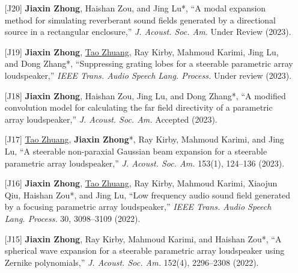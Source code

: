 \documentclass[10pt,a4paper,ragged2e,withhyper]{altacv}
\newcommand{\PubJournal}[1]{\textit{#1}}
\newcommand{\PubTitle}[1]{``{#1,}''}
\newcommand{\PubCorAuthor}[1]{#1*}
\newcommand{\PubMe}[1]{\textbf{#1}}
\begin{document}
\begin{itemize}[leftmargin = 30pt]
    \justifying 
    \item[{[J20]}]
        \PubMe{Jiaxin Zhong}, Haishan Zou, and \PubCorAuthor{Jing Lu},
        \PubTitle{A modal expansion method for simulating reverberant sound fields generated by a directional source in a rectangular enclosure}
        \PubJournal{J. Acoust. Soc. Am.} 
        Under Review (2023).
    \item[{[J19]}]
        \PubMe{Jiaxin Zhong}, \underline{Tao Zhuang}, Ray Kirby, Mahmoud Karimi, Jing Lu, and \PubCorAuthor{Dong Zhang},
        \PubTitle{Suppressing grating lobes for a steerable parametric array loudspeaker}
        \PubJournal{IEEE Trans. Audio Speech Lang. Process.}
        Under review (2023).
        
    \item[{[J18]}]
        \PubMe{Jiaxin Zhong}, Haishan Zou, Jing Lu, and \PubCorAuthor{Dong Zhang},
        \PubTitle{A modified convolution model for calculating the far field directivity of a parametric array loudspeaker}
        \PubJournal{J. Acoust. Soc. Am.}
        Accepted (2023).


    \item[{[J17]}]
        \underline{Tao Zhuang}, 
        \PubCorAuthor{\PubMe{Jiaxin Zhong}},
        Ray Kirby, Mahmoud Karimi, and Jing Lu, 
        \PubTitle{A steerable non-paraxial Gaussian beam expansion for a steerable parametric array loudspeaker}
        \PubJournal{J. Acoust. Soc. Am.}
        153(1), 124--136 (2023).
        \href{https://doi.org/10.1121/10.0016816}{\color{accent}\aiDoi}
        \href{https://github.com/JiaxinZhong/JiaxinZhong.github.io/raw/master/publications/journal/Zhuang2023-JASA-PAL_steerable_GBE.pdf}{\color{accent}\faFilePdf[regular]}

    \item[{[J16]}]
        \PubMe{Jiaxin Zhong}, \underline{Tao Zhuang}, Ray Kirby, Mahmoud Karimi, Xiaojun Qiu, \PubCorAuthor{Haishan Zou}, and Jing Lu,
        \PubTitle{Low frequency audio sound field generated by a focusing parametric array loudspeaker}
        \PubJournal{IEEE Trans. Audio Speech Lang. Process.}
        30, 3098--3109 (2022).
        \href{https://doi.org/10.1109/TASLP.2022.3209944}{\color{accent}\aiDoi}
        \href{https://github.com/JiaxinZhong/JiaxinZhong.github.io/raw/master/publications/journal/Zhong2022-IEEETASLP-Focusing_PAL.pdf}{\color{accent}\faFilePdf[regular]}

    \item[{[J15]}]
        \PubMe{Jiaxin Zhong}, Ray Kirby, Mahmoud Karimi, and \PubCorAuthor{Haishan Zou},
        \PubTitle{A spherical wave expansion for a steerable parametric array loudspeaker using Zernike polynomials} 
        \PubJournal{J. Acoust. Soc. Am.} 
        152(4), 2296--2308 (2022).
        \href{https://doi.org/10.1121/10.0014832}{\color{accent}\aiDoi}
        \href{https://github.com/JiaxinZhong/JiaxinZhong.github.io/raw/master/publications/journal/Zhong2022-JASA-PAL_Zernike.pdf}{\color{accent}\faFilePdf[regular]}


\end{itemize}
\end{document}
